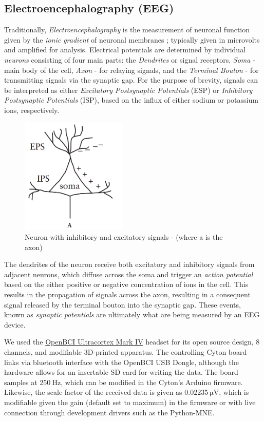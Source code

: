 \documentclass[twoside, 12pt]{article}
\theoremstyle{plain}
\begin{document}
\subsection{Electroencephalography (EEG)}
Traditionally, \textit{Electroencephalography} is the measurement of neuronal function given by the \textit{ionic gradient} of neuronal membranes \cite{tatum_handbook_2013}; typically given in microvolts and amplified for analysis. Electrical potentials are determined by individual \textit{neurons} consisting of four main parts: the \textit{Dendrites} or signal receptors, \textit{Soma} - main body of the cell, \textit{Axon} - for relaying signals, and the \textit{Terminal Bouton} - for transmitting signals via the synaptic gap. For the purpose of brevity, signals can be interpreted as either \textit{Excitatory Postsynaptic Potentials} (ESP) or \textit{Inhibitory Postsynaptic Potentials} (ISP), based on the influx of either sodium or potassium ions, respectively.
\begin{figure}[ht]
  \centering
  \includegraphics[width=2in]{Neuron.png}
  \caption{Neuron with inhibitory and excitatory signals - (where a is the axon)}
  \label{fig:neuron}
\end{figure}
The dendrites of the neuron receive both excitatory and inhibitory signals from adjacent neurons, which diffuse across the soma and trigger an \textit{action potential} based on the either positive or negative concentration of ions in the cell. This results in the propagation of signals across the axon, resulting in a consequent signal released by the terminal bouton into the synaptic gap. These events, known as \textit{synaptic potentials} are ultimately what are being measured by an EEG device.

We used the \href{http://docs.openbci.com/Headware/01-Ultracortex-Mark-IV}{OpenBCI Ultracortex Mark IV} headset for its open source design, 8 channels, and modifiable 3D-printed apparatus. The controlling Cyton board links via bluetooth interface with the OpenBCI USB Dongle, although the hardware allows for an insertable SD card for writing the data. The board samples at $\SI{250}{\hertz}$, which can be modified in the Cyton's Arduino firmware. Likewise, the scale factor of the received data is given as $\SI{0.02235}{\micro\volt}$, which is modifiable given the gain (default set to maximum) in the firmware or with live connection through development drivers such as the Python-MNE.
\end{document}
